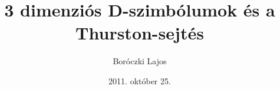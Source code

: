 \usepackage[magyar]{babel}
\usepackage[T1]{fontenc}
\usepackage[utf8]{inputenc}
\usepackage{graphicx}
\usepackage{listings}
\usepackage{amsmath}
\usepackage{amssymb}
\usepackage{ae,aecompl}


\newtheorem{thm}{Tétel}[section]
\newtheorem{thmsub}{Tétel}[subsection]
\newtheorem{lem}[thm]{Lemma}
\newtheorem{lemsub}[thmsub]{Lemma}
\newtheorem{all}[thm]{Állítás}
\newtheorem{allsub}[thmsub]{Állítás}
\newtheorem{kov}[thm]{Következmény}
\newtheorem{sej}[thm]{Sejtés}

\newtheorem{defn}[thm]{Definíció}
\newtheorem{defnsub}[thmsub]{Definíció}
\newtheorem{jel}[thm]{Jelölés}

\newtheorem{alg}[thm]{Algoritmus}
\newtheorem{megj}[thm]{Megjegyzés}
\newenvironment{biz}{Bizonyítás: }{$\square$}
\newcommand{\leftexp}[2]{{\vphantom{#2}}^{#1}{#2}}

\title{3 dimenziós D-szimbólumok és a Thurston-sejtés}
\author{Boróczki Lajos}
\date{2011. október 25.}



\begin{frame}
  \maketitle
\end{frame}

\begin{frame}
  \tableofcontents
\end{frame}
\newpage

